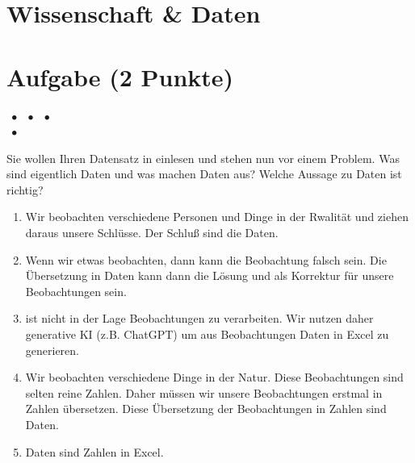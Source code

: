 \documentclass[a4paper, 9pt]{scrartcl}\usepackage[]{graphicx}\usepackage[]{xcolor}
\begin{document}
\section*{Wissenschaft \& Daten} 

\section{Aufgabe \hfill (2 Punkte)}

\ifcollection
\begin{flushright}
\tiny\vspace{-2Ex}
\textbf{\examinhaltstart}
\exammodulemathstat $\;\bullet$
\exammodulestat $\;\bullet$
\exammodulestatbbv $\;\bullet$
\exammodulestatversuch\\
\exammodulelanddaten $\;\bullet$
\exammodulebiostat
\vspace{-1Ex}
\end{flushright}
\fi




Sie wollen Ihren Datensatz in \Rlogo einlesen und stehen nun vor einem Problem. Was sind eigentlich Daten und was machen Daten aus? Welche Aussage zu Daten ist richtig?



\begin{enumerate}
\item [\textbf{A} \msquare] Wir beobachten verschiedene Personen und Dinge in der Rwalität und ziehen daraus unsere Schlüsse. Der Schluß sind die Daten.
\item [\textbf{B} \msquare] Wenn wir etwas beobachten, dann kann die Beobachtung falsch sein. Die Übersetzung in Daten kann dann die Lösung und als Korrektur für unsere Beobachtungen sein.
\item [\textbf{C} \msquare] \Rlogo ist nicht in der Lage Beobachtungen zu verarbeiten. Wir nutzen daher generative KI (z.B. ChatGPT) um aus Beobachtungen Daten in Excel zu generieren.
\item [\textbf{D} \msquare] Wir beobachten verschiedene Dinge in der Natur. Diese Beobachtungen sind selten reine Zahlen. Daher müssen wir unsere Beobachtungen erstmal in Zahlen übersetzen. Diese Übersetzung der Beobachtungen in Zahlen sind Daten.
\item [\textbf{E} \msquare] Daten sind Zahlen in Excel.
\end{enumerate} 
\end{document}
